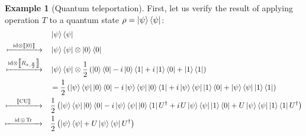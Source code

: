 \documentclass[10pt,a4paper]{amsart}
\theoremstyle{definition}
\theoremstyle{definition}
\newtheorem{example}[definition]{Example}
\theoremstyle{definition}
\theoremstyle{definition}
\theoremstyle{definition}
\theoremstyle{definition}
\begin{document}
\begin{example}[Quantum teleportation]
First, let us verify the result  of applying operation  $T$ to a quantum state $\rho=\ket{\psi}\bra{\psi}$:
\begin{equation*} \label{eq:operation_T}
  \begin{split}
  &\ket{\psi} \bra{\psi}\\
 \xmapsto{ \hspace{6pt}\mathrm{id}\otimes \left \llbracket \ket{0} \right \rrbracket \hspace{6pt}} \quad & \ket{\psi} \bra{\psi} \otimes \ket{0} \bra{0} \\
  \xmapsto{ \mathrm{id}\otimes \left \llbracket R_{x,\frac{\pi}{2}} \right \rrbracket} \quad  & \ket{\psi} \bra{\psi} \otimes \frac{1}{2} \left( \ket{0}\bra{0} -i \ket{0}\bra{1} + i \ket{1}\bra{0} + \ket{1}\bra{1} \right)  \\
  & = \frac{1}{2} \left( \ket{\psi} \bra{\psi}  \ket{0}\bra{0} -i \ket{\psi} \bra{\psi}\ket{0}\bra{1} + i \ket{\psi} \bra{\psi} \ket{1}\bra{0} + \ket{\psi} \bra{\psi}  \ket{1}\bra{1} \right) \\
  \xmapsto{\hspace{12pt} \left \llbracket \text{CU} \right \rrbracket \hspace{12pt}} \quad & \frac{1}{2} \left( \ket{\psi} \bra{\psi} \ket{0}\bra{0} - i\ket{\psi} \bra{\psi}\ket{0}\bra{1} U^{\dag} + i \hspace{1pt} U\ket{\psi} \bra{\psi} \ket{1}\bra{0} + U \ket{\psi} \bra{\psi}  \ket{1}\bra{1}U^{\dag} \right) \\ 
  \xmapsto{ \hspace{10pt} \mathrm{id}\hspace{1pt}\otimes \hspace{1pt} \text{Tr}\hspace{10pt} } \quad & \frac{1}{2} \left(\ket{\psi} \bra{\psi} + U\ket{\psi} \bra{\psi}U^{\dag} \right) \\
  \end{split} 
\end{equation*}


\end{example}
\end{document}

